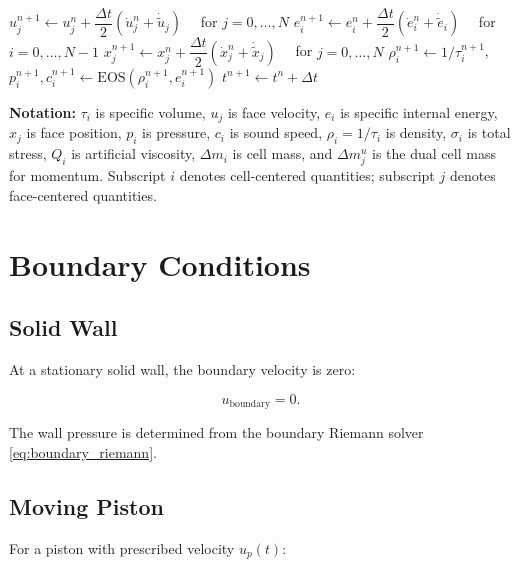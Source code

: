 \documentclass[12pt,a4paper]{article}
\begin{document}
\begin{algorithm}[H]
\begin{algorithmic}[1]
    \State $u_j^{n+1} \gets u_j^n + \dfrac{\Delta t}{2} \left( \dot{u}_j^n + \dot{\tilde{u}}_j \right) \quad$ for $j = 0, \ldots, N$
    \State $e_i^{n+1} \gets e_i^n + \dfrac{\Delta t}{2} \left( \dot{e}_i^n + \dot{\tilde{e}}_i \right) \quad$ for $i = 0, \ldots, N-1$
    \State $x_j^{n+1} \gets x_j^n + \dfrac{\Delta t}{2} \left( \dot{x}_j^n + \dot{\tilde{x}}_j \right) \quad$ for $j = 0, \ldots, N$
    \State $\rho_i^{n+1} \gets 1/\tau_i^{n+1}$, \quad $p_i^{n+1}, c_i^{n+1} \gets \text{EOS}(\rho_i^{n+1}, e_i^{n+1})$
    \State
    \State $t^{n+1} \gets t^n + \Delta t$
\EndWhile
\end{algorithmic}
\end{algorithm}

\noindent \textbf{Notation:} $\tau_i$ is specific volume, $u_j$ is face velocity, $e_i$ is specific internal energy, $x_j$ is face position, $p_i$ is pressure, $c_i$ is sound speed, $\rho_i = 1/\tau_i$ is density, $\sigma_i$ is total stress, $Q_i$ is artificial viscosity, $\Delta m_i$ is cell mass, and $\Delta m_j^u$ is the dual cell mass for momentum. Subscript $i$ denotes cell-centered quantities; subscript $j$ denotes face-centered quantities.

\section{Boundary Conditions}
\label{sec:boundary}

\subsection{Solid Wall}

At a stationary solid wall, the boundary velocity is zero:

\begin{equation}
    u_{\text{boundary}} = 0.
    \label{eq:solid_wall}
\end{equation}

The wall pressure is determined from the boundary Riemann solver \eqref{eq:boundary_riemann}.

\subsection{Moving Piston}

For a piston with prescribed velocity $u_p(t)$:
\end{document}
